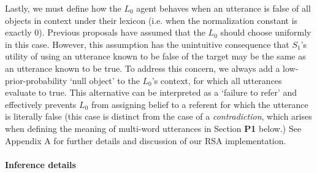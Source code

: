 Lastly, we must define how the $L_0$ agent behaves when an utterance is false of all objects in context under their lexicon (i.e. when the normalization constant is exactly 0). 
Previous proposals have assumed that the $L_0$ should choose uniformly in this case.
However, this assumption has the unintuitive consequence that $S_1$'s utility of using an utterance known to be false of the target may be the same as an utterance known to be true.
To address this concern, we always add a low-prior-probability `null object' to the $L_0$'s context, for which all utterances evaluate to true.
This alternative can be interpreted as a `failure to refer' and effectively prevents $L_0$ from assigning belief to a referent for which the utterance is literally false (this case is distinct from the case of a \emph{contradiction}, which arises when defining the meaning of multi-word utterances in Section \textbf{P1} below.)
See Appendix A for further details and discussion of our RSA implementation.

\paragraph{Inference details}

